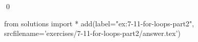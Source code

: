 
\begin{ex}
  \label{ex:7-11-for-loops-part2}
  
  \qed
\end{ex}
\begin{python0}
from solutions import *
add(label="ex:7-11-for-loops-part2",
    srcfilename='exercises/7-11-for-loops-part2/answer.tex')
\end{python0}

